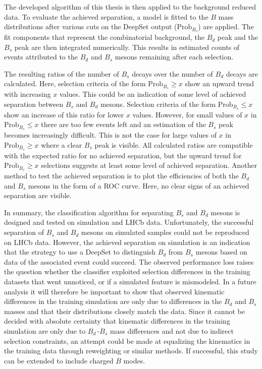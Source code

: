 The developed algorithm of this thesis is then applied to the background reduced data.
To evaluate the achieved separation, a model is fitted to the $B$ mass distributions after various cuts on the DeepSet output ($\text{Prob}_{B_s}$) are applied.
The fit components that represent the combinatorial background, the $B_d$ peak and the $B_s$ peak are then integrated numerically.
This results in estimated counts of events attributed to the $B_d$ and $B_s$ mesons remaining after each selection.

The resulting ratios of the number of $B_s$ decays over the number of $B_d$ decays are calculated.
Here, selection criteria of the form $\text{Prob}_{B_s} \geq x$ show an upward trend with increasing $x$ values.
This could be an indication of some level of achieved separation between $B_s$ and $B_d$ mesons.
Selection criteria of the form $\text{Prob}_{B_s} \leq x$ show an increase of this ratio for lower $x$ values.
However, for small values of $x$ in $\text{Prob}_{B_s} \leq x$ there are too few events left and an estimation of the $B_s$ peak becomes increasingly difficult. 
This is not the case for large values of $x$ in $\text{Prob}_{B_s} \geq x$ where a clear $B_s$ peak is visible.
All calculated ratios are compatible with the expected ratio for no achieved separation, but the upward trend for $\text{Prob}_{B_s} \geq x$ selections suggests at least some level of achieved separation.
Another method to test the achieved separation is to plot the efficiencies of both the $B_d$ and $B_s$ mesons in the form of a ROC curve.
Here, no clear signs of an achieved separation are visible.

In summary, the classification algorithm for separating $B_s$ and $B_d$ mesons is designed and tested on simulation and LHCb data. 
Unfortunately, the successful separation of $B_s$ and $B_d$ mesons on simulated samples could not be reproduced on LHCb data.
However, the achieved separation on simulation is an indication that the strategy to use a DeepSet to distinguish $B_d$ from $B_s$ mesons based on data of the associated event could succeed. 
The observed performance loss raises the question whether the classifier exploited selection differences in the training datasets that went unnoticed, or if a simulated feature is mismodeled. 
In a future analysis it will therefore be important to show that observed kinematic differences in the training simulation are only due to differences in the $B_d$ and $B_s$ masses and that their distributions closely match the data. Since it cannot be decided with absolute certainty that kinematic differences in the training simulation are only due to $B_d$\,-$B_s$ mass differences and not due to indirect selection constraints, an attempt could be made at equalizing the kinematics in the training data through reweighting or similar methods. 
If successful, this study can be extended to include charged $B$ modes.
